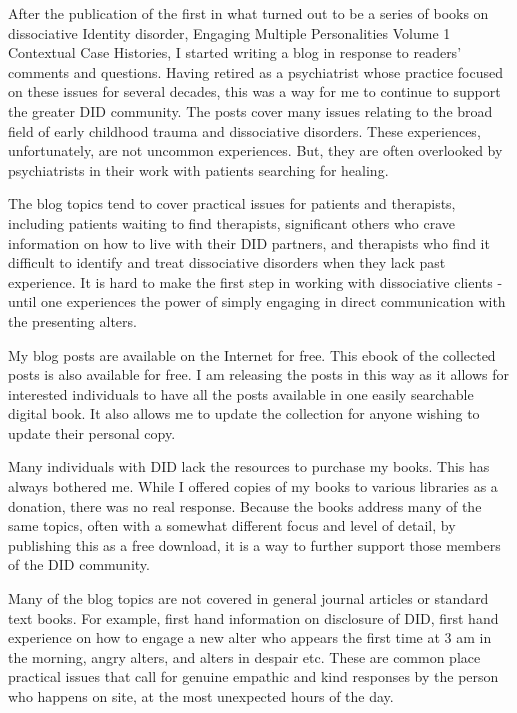 \documentclass[]{book}
\begin{document}
After the publication of the first in what turned out to be a series of books on dissociative Identity disorder, Engaging Multiple Personalities Volume 1 Contextual Case Histories, I started writing a blog in response to readers' comments and questions. Having retired as a psychiatrist whose practice focused on these issues for several decades, this was a way for me to continue to support the greater DID community.
The posts cover many issues relating to the broad field of early childhood trauma and dissociative disorders. These experiences, unfortunately, are not uncommon experiences. But, they are often overlooked by psychiatrists in their work with patients searching for healing.

The blog topics tend to cover practical issues for patients and therapists, including patients waiting to find therapists, significant others who crave information on how to live with their DID partners, and therapists who find it difficult to identify and treat dissociative disorders when they lack past experience. It is hard to make the first step in working with dissociative clients - until one experiences the power of simply engaging in direct communication with the presenting alters.

My blog posts are available on the Internet for free. This ebook of the collected posts is also available for free. I am releasing the posts in this way as it allows for interested individuals to have all the posts available in one easily searchable digital book. It also allows me to update the collection for anyone wishing to update their personal copy.

Many individuals with DID lack the resources to purchase my books. This has always bothered me. While I offered copies of my books to various libraries as a donation, there was no real response. Because the books address many of the same topics, often with a somewhat different focus and level of detail, by publishing this as a free download, it is a way to further support those members of the DID community.

Many of the blog topics are not covered in general journal articles or standard text books. For example, first hand information on disclosure of DID, first hand experience on how to engage a new alter who appears the first time at 3 am in the morning, angry alters, and alters in despair etc. These are common place practical issues that call for genuine empathic and kind responses by the person who happens on site, at the most unexpected hours of the day.
\end{document}
